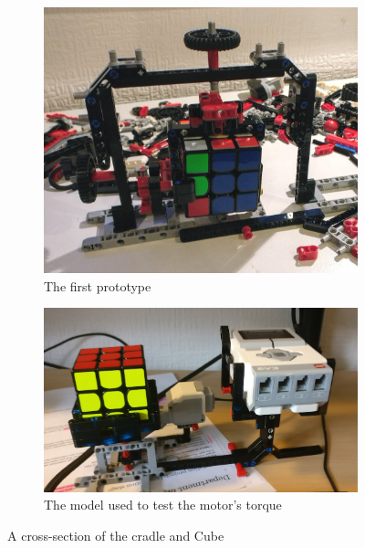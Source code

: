 \documentclass{report}
\begin{document}
    \begin{figure}[H]
		\centering
		\begin{subfigure}[b]{0.30675\textwidth}
			\includegraphics[width=\textwidth]{Resources/Images/imgPrototype.jpg}
			\caption{The first prototype}
			\label{fig:imgPrototype}
		\end{subfigure}
		\hspace{10mm}
		\begin{subfigure}[b]{0.44325\textwidth}
			\includegraphics[width=\textwidth]{Resources/Images/imgCradleTest.jpg}
			\caption{The model used to test the motor's torque}
			\label{fig:imgCradleTest}
		\end{subfigure}
		\caption{A cross-section of the cradle and Cube}
		\label{fig:imgPrototypes}
	\end{figure}
\end{document}
